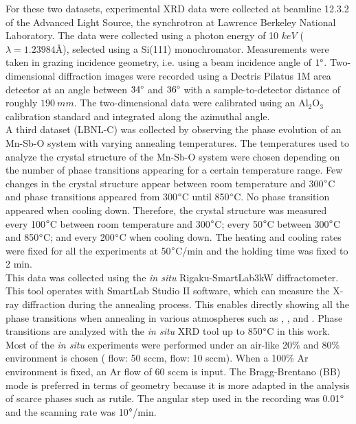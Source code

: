 For these two datasets, experimental XRD data were collected at beamline 12.3.2 of the Advanced Light Source, the synchrotron at Lawrence Berkeley National Laboratory. The data were collected using a photon energy of 10 $\si{keV}$ ($\lambda = 1.23984 \text{\AA}$), selected using a Si(111) monochromator. Measurements were taken in grazing incidence geometry, i.e. using a beam incidence angle of $1\degree$. Two-dimensional diffraction images were recorded using a Dectris Pilatus 1M area detector at an angle between $34\degree$ and $36\degree$ with a sample-to-detector distance of roughly $190 \ \si{mm}$. The two-dimensional data were calibrated using an Al$_{2}$O$_{3}$ calibration standard and integrated along the azimuthal angle. \\


A third dataset (LBNL-C) was collected by observing the phase evolution of an Mn-Sb-O system with varying annealing temperatures. The temperatures used to analyze the crystal structure of the Mn-Sb-O system were chosen depending on the number of phase transitions appearing for a certain temperature range. Few changes in the crystal structure appear between room temperature and 300$\degree$C and phase transitions appeared from 300$\degree$C until 850$\degree$C. No phase transition appeared when cooling down. Therefore, the crystal structure was measured every 100$\degree$C between room temperature and 300$\degree$C; every 50$\degree$C between 300$\degree$C and 850$\degree$C; and every 200$\degree$C when cooling down. The heating and cooling rates were fixed for all the experiments at 50$\degree$C/min and the holding time was fixed to 2 min. \\

This data was collected using the \textit{in situ}  Rigaku-SmartLab3kW diffractometer. This tool operates with SmartLab Studio II software, which can measure the X-ray diffraction during the annealing process. This enables directly showing all the phase transitions when annealing in various atmospheres such as , , and . Phase transitions are analyzed with the \textit{in situ} XRD tool up to 850$\degree$C in this work. Most of the \textit{in situ} experiments were performed under an air-like 20\%  and 80\%  environment is chosen ( flow: 50 \si{sccm},  flow: 10 \si{sccm}). When a 100\% Ar environment is fixed, an Ar flow of 60 \si{sccm} is input. The Bragg-Brentano (BB) mode is preferred in terms of geometry because it is more adapted in the analysis of scarce phases such as   rutile. The angular step used in the recording was 0.01$\degree$ and the scanning rate was 10$\degree$/min. 


